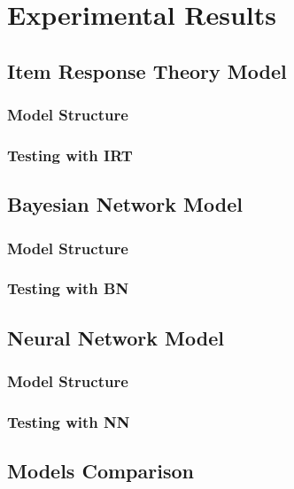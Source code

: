 \chapter{Experimental Results}
\section{Item Response Theory Model}
\subsection{Model Structure}
\subsection{Testing with IRT}

\section{Bayesian Network Model}
\subsection{Model Structure}

\subsection{Testing with BN}

\section{Neural Network Model}
\subsection{Model Structure}
\subsection{Testing with NN}

\section{Models Comparison}